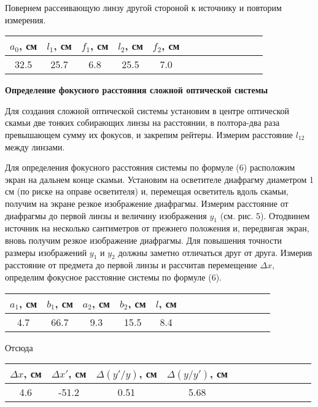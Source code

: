 \documentclass[14pt]{article}
\begin{document}
Повернем рассеивающую линзу другой стороной
к источнику
и повторим
измерения.

\begin{center}
\begin{tabular}{|c|c|c|c|c|c|c|c|c|c|c|c|c|}
\hline
$a_0$, см	&	$l_1$, см	&	$f_1$, см	&	$l_2$, см	&	$f_2$, см	\\
\hline
32.5		&	25.7		&	6.8			&	25.5		&	7.0			\\
\hline
\end{tabular}
\end{center}


\vspace{1cm}
\textbf{Определение фокусного расстояния сложной оптической системы}

Для создания сложной оптической системы
установим в центре оптической
скамьи две тонких собирающих линзы на расстоянии, в полтора-два
раза превышающем сумму их фокусов,
и закрепим рейтеры. Измерим расстояние $l_{12}$ между линзами.

Для определения фокусного расстояния системы по формуле (6) расположим
экран на дальнем конце скамьи.
Установим на осветителе диафрагму диаметром 1 см (по риске на
оправе осветителя) и, перемещая осветитель вдоль скамьи, получим
на экране резкое изображение диафрагмы. Измерим расстояние от диафрагмы
до первой линзы и величину изображения $y_1$ (см. рис. 5).
Отодвинем источник на несколько сантиметров от прежнего положения
и, передвигая экран, вновь получим резкое изображение диафрагмы.
Для повышения точности размеры изображений
$y_1$ и
$y_2$ должны
заметно отличаться друг от друга. Измерив расстояние от предмета до
первой линзы
и рассчитав перемещение
$\Delta x$, определим фокусное расстояние
системы по формуле (6).

\begin{center}
\begin{tabular}{|c|c|c|c|c|c|c|c|c|c|c|c|c|c|}
\hline
$a_1$, см	&	$b_1$, см	&	$a_2$, см	&	$b_2$, см	&	$l$, см		\\
\hline
4.7			&	66.7		&	9.3			&	15.5		&	8.4			\\
\hline
\end{tabular}
\end{center}

Отсюда
\begin{center}
\begin{tabular}{|c|c|c|c|c|c|c|c|c|c|c|c|}
\hline
$\Delta x$, см	&	$\Delta x'$, см	&	$\Delta(y'/y)$, см	&	$\Delta(y/y')$, см	\\
\hline
4.6				&	-51.2			&	0.51				&	5.68				\\
\hline
\end{tabular}
\end{center}
\end{document}
